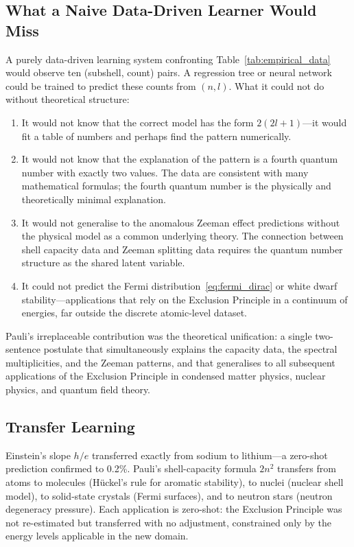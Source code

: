 \documentclass[12pt]{article}
\begin{document}
\subsection{What a Naive Data-Driven Learner Would Miss}

A purely data-driven learning system confronting Table~\ref{tab:empirical_data}
would observe ten (subshell, count) pairs.  A regression tree or neural
network could be trained to predict these counts from $(n,l)$.  What it could
not do without theoretical structure:

\begin{enumerate}
  \item It would not know that the correct model has the form $2(2l+1)$---it
    would fit a table of numbers and perhaps find the pattern numerically.
  \item It would not know that the explanation of the pattern is a fourth quantum
    number with exactly two values.  The data are consistent with many mathematical
    formulas; the fourth quantum number is the physically and theoretically
    minimal explanation.
  \item It would not generalise to the anomalous Zeeman effect predictions
    without the physical model as a common underlying theory.  The connection
    between shell capacity data and Zeeman splitting data requires the quantum
    number structure as the shared latent variable.
  \item It could not predict the Fermi distribution~\eqref{eq:fermi_dirac} or
    white dwarf stability---applications that rely on the Exclusion Principle
    in a continuum of energies, far outside the discrete atomic-level dataset.
\end{enumerate}

Pauli's irreplaceable contribution was the theoretical unification: a single
two-sentence postulate that simultaneously explains the capacity data, the
spectral multiplicities, and the Zeeman patterns, and that generalises to
all subsequent applications of the Exclusion Principle in condensed matter
physics, nuclear physics, and quantum field theory.

\subsection{Transfer Learning}

Einstein's slope $h/e$ transferred exactly from sodium to lithium---a
zero-shot prediction confirmed to 0.2\%.  Pauli's shell-capacity formula
$2n^2$ transfers from atoms to molecules (Hückel's rule for aromatic
stability), to nuclei (nuclear shell model), to solid-state crystals
(Fermi surfaces), and to neutron stars (neutron degeneracy pressure).
Each application is zero-shot: the Exclusion Principle was not re-estimated
but transferred with no adjustment, constrained only by the energy levels
applicable in the new domain.
\end{document}
